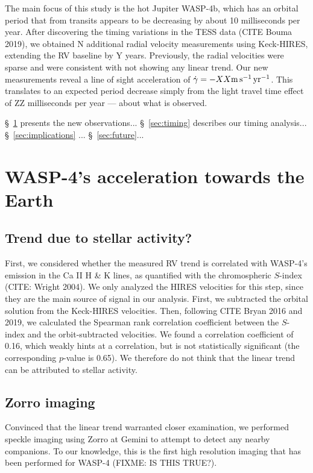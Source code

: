 \documentclass[12pt,twocolumn,tighten]{aastex62}
\begin{document}
The main focus of this study is the hot Jupiter WASP-4b, which has an
orbital period that from transits appears to be decreasing by about 10
milliseconds per year.
After discovering the timing variations in the TESS data (CITE Bouma
2019), we obtained N additional radial velocity measurements using
Keck-HIRES, extending the RV baseline by Y years.
Previously, the radial velocities were sparse and were consistent with
not showing any linear trend.
Our new measurements reveal a line of sight acceleration of
$\dot{\gamma} = -XX {\rm m\,s^{-1}\,yr^{-1}}$.
This translates to an expected period decrease simply from the light
travel time effect of ZZ milliseconds per year --- about what is
observed.

\S~\ref{sec:observations} presents the new observations...
\S~\ref{sec:timing} describes our timing analysis...
\S~\ref{sec:implications} ...
\S~\ref{sec:future}...


\section{WASP-4's acceleration towards the Earth}
\label{sec:observations}


\subsection{Trend due to stellar activity?}

First, we considered whether the measured RV trend is correlated with
WASP-4's emission in the Ca II H \& K lines, as quantified with the
chromospheric $S$-index (CITE: Wright 2004).  We only analyzed the
HIRES velocities for this step, since they are the main source of
signal in our analysis.  First, we subtracted the orbital solution
from the Keck-HIRES velocities.  Then, following CITE Bryan 2016 and
2019, we calculated the Spearman rank correlation coefficient between
the $S$-index and the orbit-subtracted velocities.  We found a
correlation coefficient of 0.16, which weakly hints at a correlation,
but is not statistically significant (the corresponding $p$-value is
0.65).  We therefore do not think that the linear trend can be
attributed to stellar activity.


\subsection{Zorro imaging}

Convinced that the linear trend warranted closer examination, we
performed speckle imaging using Zorro at Gemini to attempt to detect
any nearby companions.  To our knowledge, this is the first high
resolution imaging that has been performed for WASP-4 (FIXME: IS THIS
TRUE?).
\end{document}
